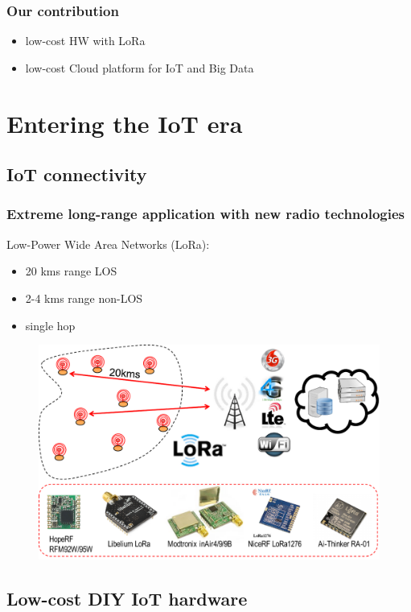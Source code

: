 \documentclass{beamer}
\begin{document}
\begin{frame}
\frametitle{Our contribution}
 
  \begin{itemize}
    \item low-cost HW with LoRa  
    \item low-cost Cloud platform for IoT and Big Data
  \end{itemize}

\end{frame}

\section{Entering the IoT era}

\subsection{IoT connectivity}

\begin{frame}
\frametitle{Extreme long-range application with new radio technologies}
Low-Power Wide Area Networks (LoRa):
  \begin{itemize}
    \item 20 kms range LOS
    \item 2-4 kms range non-LOS
    \item single hop
  \end{itemize}



\begin{figure}[H]  
\centering  
\includegraphics[width=.55\linewidth]{figures/1-hop}   
\label{figure-1hop}  
\end{figure} 
\end{frame}

\subsection{Low-cost DIY IoT hardware}
\end{document}
